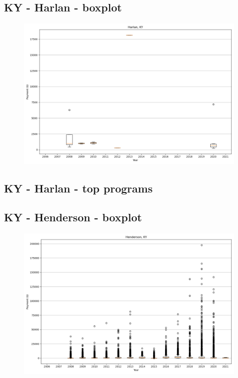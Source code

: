 \subsection*{KY - Harlan - boxplot}
\begin{figure}[h]
\centering
\includegraphics[width=7in]{../output/boxplots/counties/Harlan-KY_boxplot.png}
\end{figure}


\subsection*{KY - Harlan - top programs}

\newpage
\subsection*{KY - Henderson - boxplot}
\begin{figure}[h]
\centering
\includegraphics[width=7in]{../output/boxplots/counties/Henderson-KY_boxplot.png}
\end{figure}


